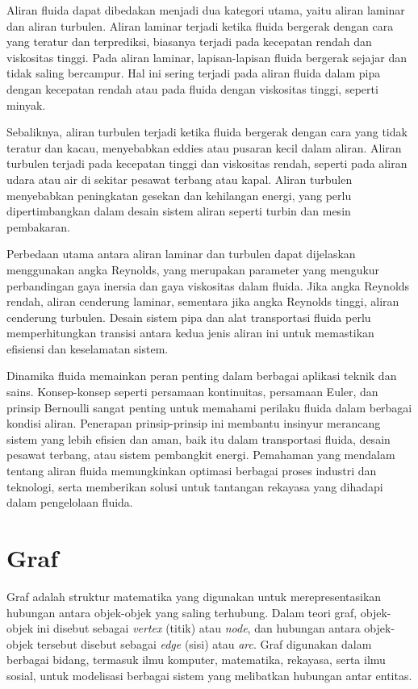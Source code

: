 Aliran fluida dapat dibedakan menjadi dua kategori utama, yaitu aliran laminar dan aliran turbulen. Aliran laminar terjadi ketika fluida bergerak dengan cara yang teratur dan terprediksi, biasanya terjadi pada kecepatan rendah dan viskositas tinggi. Pada aliran laminar, lapisan-lapisan fluida bergerak sejajar dan tidak saling bercampur. Hal ini sering terjadi pada aliran fluida dalam pipa dengan kecepatan rendah atau pada fluida dengan viskositas tinggi, seperti minyak.

Sebaliknya, aliran turbulen terjadi ketika fluida bergerak dengan cara yang tidak teratur dan kacau, menyebabkan eddies atau pusaran kecil dalam aliran. Aliran turbulen terjadi pada kecepatan tinggi dan viskositas rendah, seperti pada aliran udara atau air di sekitar pesawat terbang atau kapal. Aliran turbulen menyebabkan peningkatan gesekan dan kehilangan energi, yang perlu dipertimbangkan dalam desain sistem aliran seperti turbin dan mesin pembakaran.

Perbedaan utama antara aliran laminar dan turbulen dapat dijelaskan menggunakan angka Reynolds, yang merupakan parameter yang mengukur perbandingan gaya inersia dan gaya viskositas dalam fluida. Jika angka Reynolds rendah, aliran cenderung laminar, sementara jika angka Reynolds tinggi, aliran cenderung turbulen. Desain sistem pipa dan alat transportasi fluida perlu memperhitungkan transisi antara kedua jenis aliran ini untuk memastikan efisiensi dan keselamatan sistem.

Dinamika fluida memainkan peran penting dalam berbagai aplikasi teknik dan sains. Konsep-konsep seperti persamaan kontinuitas, persamaan Euler, dan prinsip Bernoulli sangat penting untuk memahami perilaku fluida dalam berbagai kondisi aliran. Penerapan prinsip-prinsip ini membantu insinyur merancang sistem yang lebih efisien dan aman, baik itu dalam transportasi fluida, desain pesawat terbang, atau sistem pembangkit energi. Pemahaman yang mendalam tentang aliran fluida memungkinkan optimasi berbagai proses industri dan teknologi, serta memberikan solusi untuk tantangan rekayasa yang dihadapi dalam pengelolaan fluida.


\section{Graf}
\label{sec:graph}

Graf adalah struktur matematika yang digunakan untuk merepresentasikan hubungan antara objek-objek yang saling terhubung. Dalam teori graf, objek-objek ini disebut sebagai \emph{vertex} (titik) atau \emph{node}, dan hubungan antara objek-objek tersebut disebut sebagai \emph{edge} (sisi) atau \emph{arc}. Graf digunakan dalam berbagai bidang, termasuk ilmu komputer, matematika, rekayasa, serta ilmu sosial, untuk modelisasi berbagai sistem yang melibatkan hubungan antar entitas.

